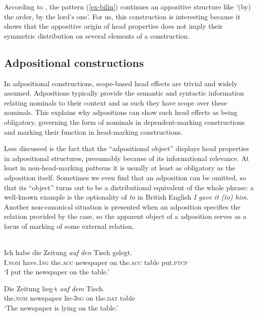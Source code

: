\documentclass[output=paper
  ,nobabel
  ,draftmode
  ,colorlinks, citecolor=brown
]{langscibook}
\begin{document}
\largerpage[2]
\noindent
According to \citet{Aristar1995}, the pattern (\ref{ex-bilin}) continues an appositive structure like `(by) the order, by the lord's one'. For us, this construction is interesting because it shows that the appositive origin of head properties does not imply their symmetric distribution on several elements of a construction.

\subsection{Adpositional constructions}\label{subsec-adpositional}

In adpositional constructions, scope-based head effects are trivial and widely assumed. Adpositions typically provide the semantic and syntactic information relating nominals to their context and as such they have scope over these nominals. This explains why adpositions can show such head effects as being obligatory, governing the form of nominals in dependent-marking constructions and marking their function in head-marking constructions.

Less discussed is the fact that the ``adpositional object'' displays head properties in adpositional
structures, presumably because of its informational relevance. At least in non-head-marking patterns
it is usually at least as obligatory as the adposition itself. Sometimes we even find that an
adposition can be omitted, so that its ``object'' turns out to be a distributional equivalent of the
whole phrase: a well-known example is the optionality of \emph{to} in British English \emph{I gave it (to)
him}. Another non-canonical situation is presented when an adposition specifies the relation
provided by the case, so the apparent object of a adposition serves as a locus of marking of some
external relation. 

\largerpage[2]
\ea\label{ex-deutsch} 
\\
\ea
\gll Ich habe die	Zeitung \emph{auf} \emph{den} Tisch gelegt.\\ 
     I.\textsc{nom}	 have.\textsc{1sg} the.\textsc{acc}	newspaper  on the.\textsc{acc} table put.\textsc{ptcp}\\
\glt `I put the newspaper on the table.'

\ex
\gll Die Zeitung lieg-t \emph{auf} \emph{dem} Tisch.\\ the.\textsc{nom}  newspaper        lie-\textsc{3sg} on the.\textsc{dat} table\\
\glt `The newspaper is lying on the table.'
\z\z
\end{document}
